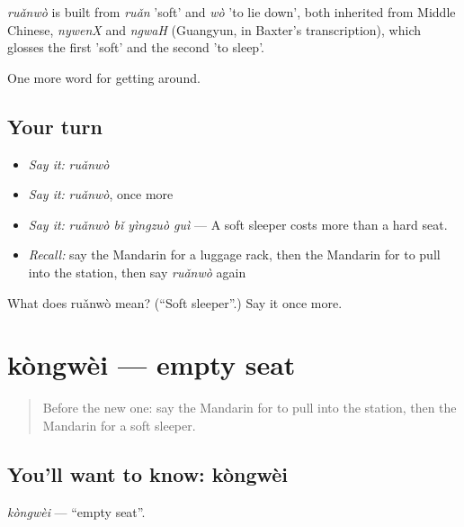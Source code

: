 \begin{cousinweb}
\emph{ruǎnwò} is built from \emph{ruǎn} 'soft' and \emph{wò} 'to lie down', both inherited from Middle Chinese, \emph{nywenX} and \emph{ngwaH} (Guangyun, in Baxter's transcription), which glosses the first 'soft' and the second 'to sleep'.
\end{cousinweb}

\begin{grammarlens}[title={What you've built}]
One more word for getting around.
\end{grammarlens}

\subsection*{Your turn}
\begin{itemize}
\raggedright
  \item \emph{Say it:} \emph{ruǎnwò}
  \item \emph{Say it:} \emph{ruǎnwò}, once more
  \item \emph{Say it:} \emph{ruǎnwò bǐ yìngzuò guì} — A soft sleeper costs more than a hard seat.
  \item \emph{Recall:} say the Mandarin for a luggage rack, then the Mandarin for to pull into the station, then say \emph{ruǎnwò} again
\end{itemize}

\begin{tcolorbox}[breakable,colback=teal!4,colframe=teal!35!black,title={Before you move on}]
What does ruǎnwò mean? (\textquotedblleft{}Soft sleeper\textquotedblright{}.) Say it once more.
\end{tcolorbox}
\section[kòngwèi]{kòngwèi — empty seat}

\label{lesson:ZH-C407-kongwei}



\begin{quote}
Before the new one: say the Mandarin for to pull into the station, then the Mandarin for a soft sleeper.
\end{quote}

\subsection*{You'll want to know: kòngwèi}
\emph{kòngwèi} — \textquotedblleft{}empty seat\textquotedblright{}.

